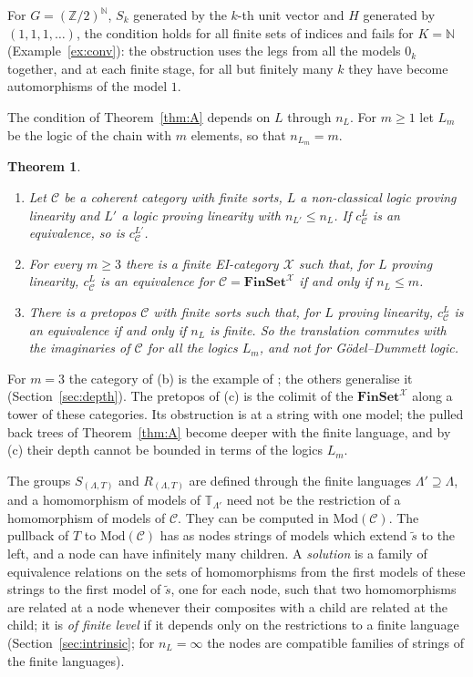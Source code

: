 \documentclass[11pt]{amsart}
\newtheorem{thm}{Theorem}[section]
\theoremstyle{definition}
\newcommand{\Fin}{\mathbf{FinSet}}
\newcommand{\Mod}{\mathrm{Mod}}
\newcommand{\cX}{\mathcal X}
\newcommand{\cC}{\mathcal C}
\newcommand{\bT}{\mathbb T}
\begin{document}
For $G=(\mathbb Z/2)^{\mathbb N}$, $S_k$ generated by the $k$-th unit
vector and $H$ generated by $(1,1,1,\dots)$, the condition holds for
all finite sets of indices and fails for $K=\mathbb N$
(Example~\ref{ex:conv}): the obstruction uses the legs from all the
models $0_k$ together, and at each finite stage, for all but finitely
many $k$ they have become automorphisms of the model $1$.

The condition of Theorem~\ref{thm:A} depends on $L$ through $n_L$. For
$m\ge1$ let $L_m$ be the logic of the chain with $m$ elements, so that
$n_{L_m}=m$.

\begin{thm}\label{thm:E}
\begin{enumerate}
\item[(a)] Let $\cC$ be a coherent category with finite sorts, $L$ a
non-classical logic proving linearity and $L'$ a logic proving
linearity with $n_{L'}\le n_L$. If $c^L_\cC$ is an equivalence, so is
$c^{L'}_\cC$.
\item[(b)] For every $m\ge3$ there is a finite EI-category $\cX$ such
that, for $L$ proving linearity, $c^L_\cC$ is an equivalence for
$\cC=\Fin^\cX$ if and only if $n_L\le m$.
\item[(c)] There is a pretopos $\cC$ with finite sorts such that, for
$L$ proving linearity, $c^L_\cC$ is an equivalence if and only if
$n_L$ is finite. So the translation commutes with the imaginaries of
$\cC$ for all the logics $L_m$, and not for G\"odel--Dummett logic.
\end{enumerate}
\end{thm}

For $m=3$ the category of (b) is the example of
\cite[Ex.~6.19]{Strings}; the others generalise it
(Section~\ref{sec:depth}). The pretopos of (c) is the colimit of the
$\Fin^{\cX}$ along a tower of these categories. Its obstruction is at
a string with one model; the pulled back trees of
Theorem~\ref{thm:A} become deeper with the finite language, and by
(c) their depth cannot be bounded in terms of the logics $L_m$.

The groups $S_{(\Lambda,T)}$ and $R_{(\Lambda,T)}$ are defined through
the finite languages $\Lambda'\supseteq\Lambda$, and a homomorphism of
models of $\bT_{\Lambda'}$ need not be the restriction of a
homomorphism of models of $\cC$. They can be computed in $\Mod(\cC)$.
The pullback of $T$ to $\Mod(\cC)$ has as nodes strings of models
which extend $\tilde s$ to the left, and a node can have infinitely
many children. A \emph{solution} is a family of equivalence relations
on the sets of homomorphisms from the first models of these strings to
the first model of $\tilde s$, one for each node, such that two
homomorphisms are related at a node whenever their composites with a
child are related at the child; it is \emph{of finite level} if it
depends only on the restrictions to a finite language
(Section~\ref{sec:intrinsic}; for $n_L=\infty$ the nodes are
compatible families of strings of the finite languages).
\end{document}

